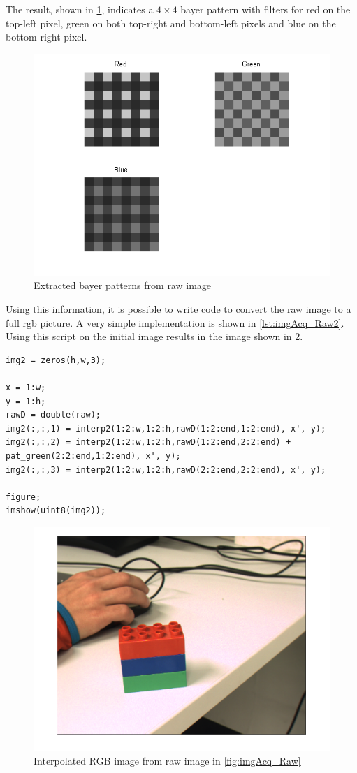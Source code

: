 \documentclass[
a4paper,     %
11pt         %
]{scrartcl}  %
\begin{document}
The result, shown in \cref{fig:imgAcq_BayerRGB}, indicates a $4 \times 4$ bayer pattern with filters for red on the top-left pixel, green on both top-right and bottom-left pixels and blue on the bottom-right pixel.

\begin{figure}[ht!]
 \centering
 \includegraphics[trim=60px 40px 60px 0, clip, width=.6\textwidth]{./Bildg_Messtechnik_Lab/ColorImageAcquisition/html/main_01.png}
 \caption{Extracted bayer patterns from raw image}
 \label{fig:imgAcq_BayerRGB}
\end{figure}

\clearpage
Using this information, it is possible to write code to convert the raw image to a full rgb picture. A very simple implementation is shown in \cref{lst:imgAcq_Raw2}. Using this script on the initial image results in the image shown in \cref{fig:imgAcq_Interp}.


\begin{lstlisting}[label=lst:imgAcq_Raw2, caption=Matlab script to convert raw pictures to RGB]
img2 = zeros(h,w,3);

x = 1:w;
y = 1:h;
rawD = double(raw);
img2(:,:,1) = interp2(1:2:w,1:2:h,rawD(1:2:end,1:2:end), x', y);
img2(:,:,2) = interp2(1:2:w,1:2:h,rawD(1:2:end,2:2:end) + pat_green(2:2:end,1:2:end), x', y);
img2(:,:,3) = interp2(1:2:w,1:2:h,rawD(2:2:end,2:2:end), x', y);

figure;
imshow(uint8(img2));
\end{lstlisting}

\begin{figure}[t]
 \centering
 \includegraphics[width=.6\textwidth]{./Bildg_Messtechnik_Lab/ColorImageAcquisition/html/main_02.png}
 \caption{Interpolated RGB image from raw image in \cref{fig:imgAcq_Raw}}  \label{fig:imgAcq_Interp}
\end{figure}
\end{document}
